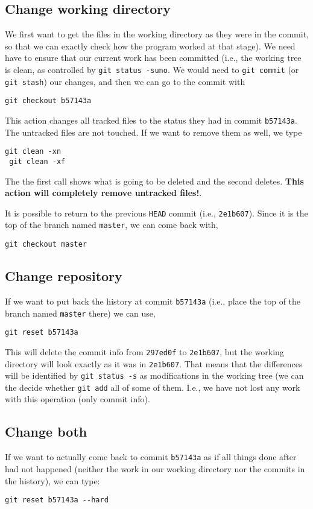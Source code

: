 \documentclass[a4paper,10pt]{article}
\begin{document}
\subsection*{Change working directory}
We first want to get the files in the working directory as they were in the commit, so that we can exactly check how the program worked at that stage). We need have to ensure that our current work has been committed (i.e., the working tree is clean, as controlled by \texttt{git status -suno}. We would need to \texttt{git commit} (or \texttt{git stash}) our changes, and then we can go to the commit with 
\begin{lstlisting}[style=Alice]
 git checkout b57143a
\end{lstlisting}
This action changes all tracked files to the status they had in commit \texttt{b57143a}. The untracked files are not touched. If we want to remove them as well, we type

\begin{lstlisting}[style=Alice]
 git clean -xn
 git clean -xf
\end{lstlisting}
The the first call shows what is going to be deleted and the second deletes. \textbf{This action will completely remove untracked files!}.

It is possible to return to the previous \texttt{HEAD} commit (i.e., \texttt{2e1b607}). Since it is the top of the branch named \texttt{master}, we can come back with,
\begin{lstlisting}[style=Alice]
 git checkout master
\end{lstlisting}

\subsection*{Change repository}
If we want to put back the history at commit \texttt{b57143a} (i.e., place the top of the branch named \texttt{master} there) we can use,
\begin{lstlisting}[style=Alice]
 git reset b57143a
\end{lstlisting}
This will delete the commit info from \texttt{297ed0f} to \texttt{2e1b607}, but the working directory will look exactly as it was in \texttt{2e1b607}. That means that the differences will be identified by \texttt{git status -s} as modifications in the working tree (we can the decide whether \texttt{git add} all of some of them. I.e., we have not lost any work with this operation (only commit info).

\subsection*{Change both}
If we want to actually come back to commit \texttt{b57143a} as if all things done after had not happened (neither the work in our working directory nor the commits in the history), we can type:
\begin{lstlisting}[style=Alice]
 git reset b57143a --hard
\end{lstlisting}
\end{document}
